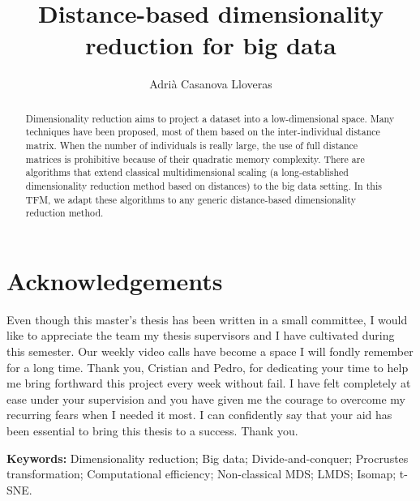 \documentclass[a4paper,12pt]{article}
\title{Distance-based dimensionality reduction for big data}
\author{Adrià Casanova Lloveras}
\begin{document}


\section*{Acknowledgements}

Even though this master's thesis has been written in a small committee, I would like to appreciate the team my thesis supervisors and I have cultivated during this semester. Our weekly video calls have become a space I will fondly remember for a long time. Thank you, Cristian and Pedro, for dedicating your time to help me bring forthward this project every week without fail. I have felt completely at ease under your supervision and you have given me the courage to overcome my recurring fears when I needed it most. I can confidently say that your aid has been essential to bring this thesis to a success. Thank you.

\pagebreak
\begin{abstract}
    Dimensionality reduction aims to project a dataset into a low-dimensional space. Many techniques have been proposed, most of them based on the inter-individual distance matrix. When the number of individuals is really large, the use of full distance matrices is prohibitive because of their quadratic memory complexity. There are algorithms that extend classical multidimensional scaling (a long-established dimensionality reduction method based on distances) to the big data setting. In this TFM, we adapt these algorithms to any generic distance-based dimensionality reduction method.
\end{abstract}

\noindent\textbf{Keywords:} Dimensionality reduction; Big data; Divide-and-conquer; Procrustes transformation; Computational efficiency; Non-classical MDS; LMDS; Isomap; t-SNE.
\pagebreak

\tableofcontents
\pagebreak


\pagebreak


\pagebreak


\pagebreak


\pagebreak


\pagebreak


\pagebreak


\pagebreak

\printbibliography
\pagebreak
\end{document}
